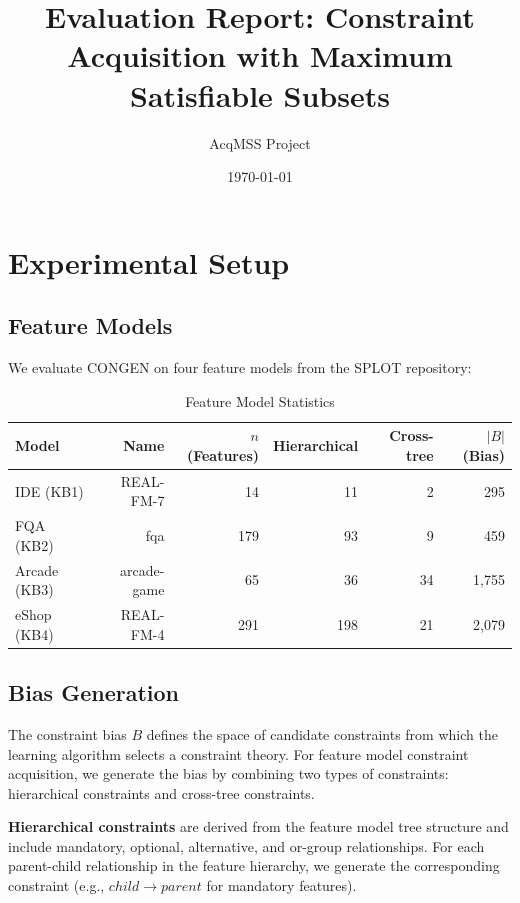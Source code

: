 \documentclass[11pt]{article}
\title{Evaluation Report: Constraint Acquisition with Maximum Satisfiable Subsets}
\author{AcqMSS Project}
\date{\today}
\begin{document}
\maketitle

\section{Experimental Setup}

\subsection{Feature Models}
We evaluate CONGEN on four feature models from the SPLOT repository:

\begin{table}[htbp]
\centering
\caption{Feature Model Statistics}
\label{tab:fm_stats}
\begin{tabular}{lrrrrr}
\toprule
\textbf{Model} & \textbf{Name} & \textbf{$n$ (Features)} & \textbf{Hierarchical} & \textbf{Cross-tree} & \textbf{$|B|$ (Bias)} \\
\midrule
IDE (KB1)    & REAL-FM-7    & 14   & 11    & 2     & 295    \\
FQA (KB2)    & fqa          & 179  & 93    & 9     & 459    \\
Arcade (KB3) & arcade-game  & 65   & 36    & 34    & 1,755  \\
eShop (KB4)  & REAL-FM-4    & 291  & 198   & 21    & 2,079  \\
\bottomrule
\end{tabular}
\end{table}

\subsection{Bias Generation}

The constraint bias $B$ defines the space of candidate constraints from which the learning algorithm selects a constraint theory. For feature model constraint acquisition, we generate the bias by combining two types of constraints: hierarchical constraints and cross-tree constraints.

\textbf{Hierarchical constraints} are derived from the feature model tree structure and include mandatory, optional, alternative, and or-group relationships. For each parent-child relationship in the feature hierarchy, we generate the corresponding constraint (e.g., $child \rightarrow parent$ for mandatory features).
\end{document}
